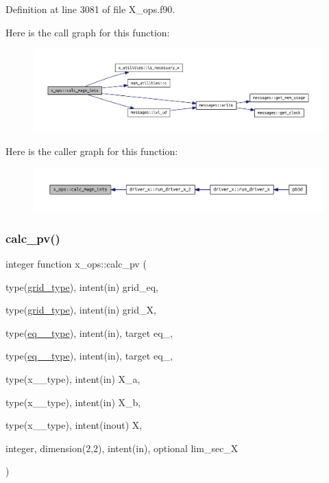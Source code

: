 Definition at line 3081 of file X\+\_\+ops.\+f90.

Here is the call graph for this function\+:\nopagebreak
\begin{figure}[H]
\begin{center}
\leavevmode
\includegraphics[width=350pt]{namespacex__ops_a6df79622d1b95d54ab3e542751a5881d_cgraph}
\end{center}
\end{figure}
Here is the caller graph for this function\+:\nopagebreak
\begin{figure}[H]
\begin{center}
\leavevmode
\includegraphics[width=350pt]{namespacex__ops_a6df79622d1b95d54ab3e542751a5881d_icgraph}
\end{center}
\end{figure}
\mbox{\label{namespacex__ops_a51f3bf0b4c8d688ffbcc3a1adbca9762}} 
\subsubsection{\texorpdfstring{calc\+\_\+pv()}{calc\_pv()}}
{\footnotesize\ttfamily integer function x\+\_\+ops\+::calc\+\_\+pv (\begin{DoxyParamCaption}\item[{type(\hyperlink{structgrid__vars_1_1grid__type}{grid\+\_\+type}), intent(in)}]{grid\+\_\+eq,  }\item[{type(\hyperlink{structgrid__vars_1_1grid__type}{grid\+\_\+type}), intent(in)}]{grid\+\_\+X,  }\item[{type(\hyperlink{structeq__vars_1_1eq__1__type}{eq\+\_\+1\+\_\+type}), intent(in), target}]{eq\+\_,  }\item[{type(\hyperlink{structeq__vars_1_1eq__2__type}{eq\+\_\+2\+\_\+type}), intent(in), target}]{eq\+\_,  }\item[{type(x\+\_\+1\+\_\+type), intent(in)}]{X\+\_\+a,  }\item[{type(x\+\_\+1\+\_\+type), intent(in)}]{X\+\_\+b,  }\item[{type(x\+\_\+2\+\_\+type), intent(inout)}]{X,  }\item[{integer, dimension(2,2), intent(in), optional}]{lim\+\_\+sec\+\_\+X }\end{DoxyParamCaption})}



